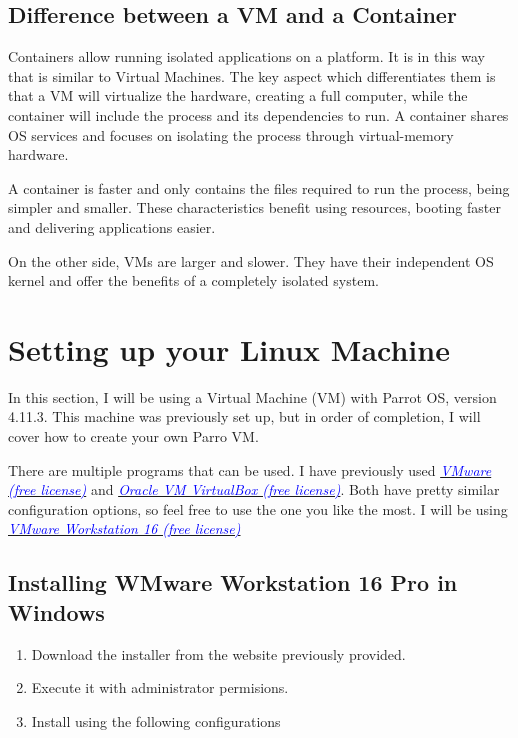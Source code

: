 \documentclass[a4paper]{article}
\newcommand{\sectionName}{Contents}
\newcommand\tab[1][1cm]{\hspace*{#1}}
\begin{document}
    \subsection{Difference between a VM and a Container}

    \tab Containers allow running isolated applications on a platform. It is in this way that is similar to 
    Virtual Machines. The key aspect which differentiates them is that a VM will virtualize the hardware, creating 
    a full computer, while the container will include the process and its dependencies to run.
    A container shares OS services and focuses on isolating the process through virtual-memory hardware.

    \tab A container is faster and only contains the files required to run the process, being simpler and smaller.
    These characteristics benefit using resources, booting faster and delivering applications easier.

    \tab On the other side, VMs are larger and slower. They have their independent OS kernel and offer the benefits
    of a completely isolated system. 


    \clearpage
    \section{Setting up your Linux Machine}
    \renewcommand{\sectionName}{Setting up your Linux Machine}
    \tab In this section, I will be using a Virtual Machine (VM) with Parrot OS, version 4.11.3. This machine 
    was previously set up, but in order of completion, I will cover how to create your own Parro VM.

    \tab There are multiple programs that can be used. I have previously used \href{https://www.vmware.com/}
    {\textcolor{blue}{\textit{VMware (free license)}}} and \href{https://www.virtualbox.org/}{\textcolor{blue}{\textit{Oracle VM VirtualBox
    (free license)}}}. Both have pretty similar configuration options, so feel free to use the one you like the most. I 
    will be using \href{https://www.vmware.com/products/workstation-player/workstation-player-evaluation.html}
    {\textcolor{blue}{\textit{VMware Workstation 16 (free license)}}} 

    \subsection{\textbf{Installing WMware Workstation 16 Pro in Windows}}
    \begin{enumerate}
        \item Download the installer from the website previously provided.
        \item Execute it with administrator permisions.
        \item Install using the following configurations
    \end{enumerate}
\end{document}
